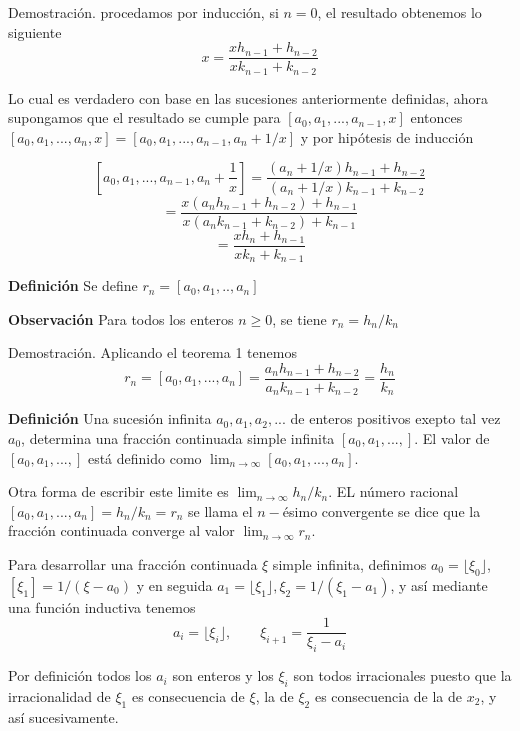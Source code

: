 \documentclass[11pt, article]{article}
\begin{document}
    Demostración. procedamos por inducción, si $n=0$, el resultado obtenemos lo siguiente
        \[
        x=\dfrac{xh_{n-1}+h_{n-2}}{xk_{n-1}+k_{n-2}}
        \]
        
    Lo cual es verdadero con base en las sucesiones anteriormente definidas, ahora supongamos que el resultado se cumple para $[a_0,a_1,...,a_{n-1},x]$ entonces $[a_0,a_1,...,a_n,x]=[a_0,a_1,...,a_{n-1},a_n + 1/x]$ y por hipótesis de inducción
    
        \[
        [a_0,a_1,...,a_{n-1},a_n + \dfrac{1}{x}]
            =\dfrac{(a_n+1/x)h_{n-1}+h_{n-2}}{(a_n+1/x)k_{n-1}+k_{n-2}}
            \]
            \[
            =\dfrac{x(a_nh_{n-1}+h_{n-2})+h_{n-1}}{x(a_nk_{n-1}+k_{n-2})+k_{n-1}}
            \]
            \[
            =\dfrac{xh_n+h_{n-1}}{xk_n+k_{n-1}}
        \]
        
    \textbf{Definición} Se define $r_n=[a_0,a_1,..,a_n]$
    
    \textbf{Observación} Para todos los enteros $n \geq 0$, se tiene $r_n=h_n/k_n$
    
    Demostración. Aplicando el teorema 1 tenemos
    \[
    r_n=[a_0,a_1,...,a_n]=\dfrac{a_nh_{n-1}+h_{n-2}}{a_nk_{n-1}+k_{n-2}}=\dfrac{h_n}{k_n}
    \]
    
    \textbf{Definición}  Una sucesión infinita $a_0, a_1, a_2,...$ de enteros positivos exepto tal vez $a_0$, determina una fracción continuada simple infinita $[a_0, a_1, ..., ]$. El valor de $[a_0, a_1, ..., ]$ está definido como $\lim_{n\to\infty}[a_0, a_1, ..., a_n]$.
    
    Otra forma de escribir este limite es $\lim_{n\to\infty} h_n/k_n$. EL número racional $[a_0, a_1, ...,a_n]=h_n/k_n=r_n$ se llama el $n-$ésimo convergente se dice que la fracción continuada converge al valor $\lim_{n\to\infty}r_n$.
    
    Para desarrollar una fracción continuada $\xi$ simple infinita, definimos $a_0=\lfloor \xi_0 \rfloor$, $[\xi_1]=1/(\xi-a_0)$ y en seguida $a_1= \lfloor \xi_1 \rfloor, \xi_2=1/(\xi_1-a_1)$, y así mediante una función inductiva tenemos
        \begin{equation}
        a_i=\lfloor \xi_i \rfloor, \qquad \xi_{i+1}=\dfrac{1}{\xi_i-a_i}
        \label{ecuacion_1}
        \end{equation}

    Por definición todos los $a_i$ son enteros y los $\xi_i$ son todos irracionales puesto que la irracionalidad de $\xi_1$ es consecuencia de $\xi$, la de $\xi_2$ es consecuencia de la de $x_2$, y así sucesivamente.
\end{document}
